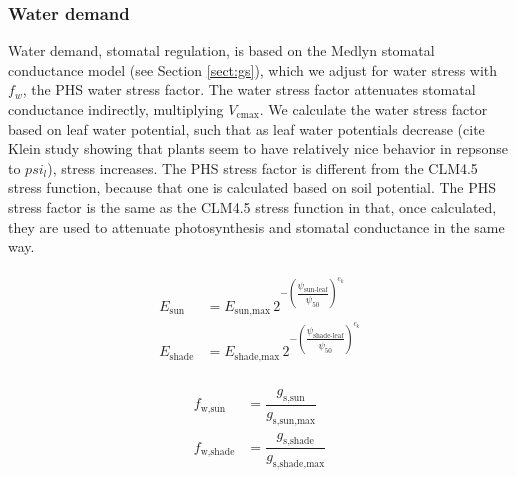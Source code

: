\documentclass[draft,linenumbers]{agujournal}
\begin{document}
    \subsubsection{Water demand}
    \label{sect:demand}
    
    Water demand, stomatal regulation, is based on the Medlyn stomatal conductance model (see Section \ref{sect:gs}), 
    which we adjust for water stress with $f_w$, the PHS water stress factor. 
    The water stress factor attenuates stomatal conductance indirectly, multiplying $V_{\text{cmax}}$.
    We calculate the water stress factor based on leaf water potential, such that 
    as leaf water potentials decrease (cite Klein study showing that plants seem to have relatively nice behavior in repsonse to $psi_l$), stress increases.
    The PHS stress factor is different from the CLM4.5 stress function, because that one 
    is calculated based on soil potential.
    The PHS stress factor is the same as the CLM4.5 stress function in that, once calculated, they are used
    to attenuate photosynthesis and stomatal conductance in the same way.

    
     \begin{linenomath*}
     \begin{eqnarray}
     \begin{aligned}
     \label{eq:demand}
     E_{\text{sun}}     &= E_{\text{sun,max}} \, 2^{-\left(\dfrac{\psi_{\text{sun-leaf}}}{\psi_{50}}\right)^{c_k}} \\
     E_{\text{shade}} &= E_{\text{shade,max}} \, 2^{-\left(\dfrac{\psi_{\text{shade-leaf}}}{\psi_{50}}\right)^{c_k}}
     \end{aligned}
     \end{eqnarray}
     \end{linenomath*}
    
    
     \begin{linenomath*}
     \begin{eqnarray}
     \begin{aligned}
     \label{eq:stress}
     f_{\text{w,sun}}         &= \dfrac{g_{\text{s,sun}}}{g_{\text{s,sun,max}}} \\
     f_{\text{w,shade}}     &= \dfrac{g_{\text{s,shade}}}{g_{\text{s,shade,max}}} \\
     \end{aligned}
     \end{eqnarray}
     \end{linenomath*}
    
\end{document}
